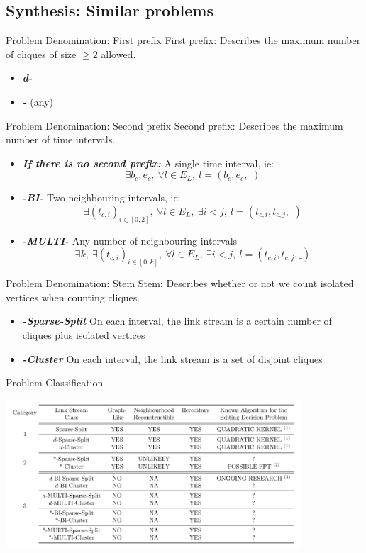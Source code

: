 \documentclass{beamer}
\begin{document}
\subsection{Synthesis: Similar problems}
\begin{frame}{Problem Denomination: First prefix}
  First prefix: Describes the maximum number of cliques of size $\geq 2$ allowed.
  \begin{itemize}
  \item \emph{\bfseries d-}
  \item \emph{\bfseries *-} (any)
  \end{itemize}
\end{frame}
\begin{frame}{Problem Denomination: Second prefix}
  Second prefix: Describes the maximum number of time intervals.
  \begin{itemize}
  \item \emph{\bfseries If there is no second prefix: } A single time interval, ie: $$\exists b_c, e_c,\ \forall l\in E_L,\ l=(b_c,e_c,\_)$$
  \item \emph{\bfseries -BI-} Two neighbouring intervals, ie: $$\exists (t_{c,i})_{i\in [0,2]},\ \forall l\in E_L,\ \exists i<j,\ l=(t_{c,i},t_{c,j},\_)$$
  \item \emph{\bfseries -MULTI-} Any number of neighbouring intervals $$\exists k,\ \exists (t_{c,i})_{i\in [0,k]},\ \forall l\in E_L,\ \exists i<j,\ l=(t_{c,i},t_{c,j},\_)$$
  \end{itemize}
\end{frame}
\begin{frame}{Problem Denomination: Stem}
  Stem: Describes whether or not we count isolated vertices when counting cliques.
  \begin{itemize}
  \item \emph{\bfseries -Sparse-Split} On each interval, the link stream is a certain number of cliques plus isolated vertices
  \item \emph{\bfseries -Cluster} On each interval, the link stream is a set of disjoint cliques
  \end{itemize}
\end{frame}
\begin{frame}{Problem Classification}
  \begin{minipage}{1\linewidth}
    \centering
    \includegraphics[width=110mm]{perspectives.png}
  \end{minipage}
\end{frame}
\end{document}

